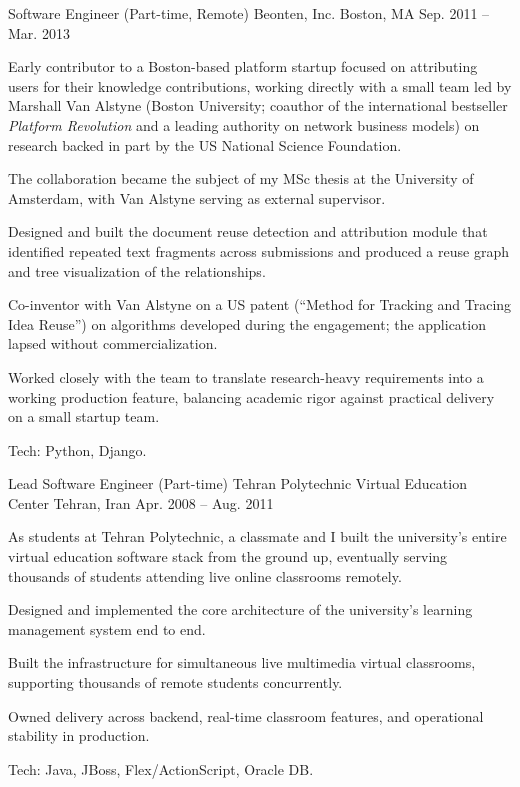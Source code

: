 \begin{cventries}
  \cventry
    {Software Engineer (Part-time, Remote)} %
    {Beonten, Inc.} %
    {Boston, MA} %
    {Sep. 2011 -- Mar. 2013} %
    {
      \begin{cvitems} %
        \item {Early contributor to a Boston-based platform startup focused on attributing users for their knowledge contributions, working directly with a small team led by Marshall Van Alstyne (Boston University; coauthor of the international bestseller \emph{Platform Revolution} and a leading authority on network business models) on research backed in part by the US National Science Foundation.}
        \item {The collaboration became the subject of my MSc thesis at the University of Amsterdam, with Van Alstyne serving as external supervisor.}
        \item {Designed and built the document reuse detection and attribution module that identified repeated text fragments across submissions and produced a reuse graph and tree visualization of the relationships.}
        \item {Co-inventor with Van Alstyne on a US patent (``Method for Tracking and Tracing Idea Reuse'') on algorithms developed during the engagement; the application lapsed without commercialization.}
        \item {Worked closely with the team to translate research-heavy requirements into a working production feature, balancing academic rigor against practical delivery on a small startup team.}
        \item {Tech: Python, Django.}
      \end{cvitems}
    }

  \cventry
    {Lead Software Engineer (Part-time)} %
    {Tehran Polytechnic Virtual Education Center} %
    {Tehran, Iran} %
    {Apr. 2008 -- Aug. 2011} %
    {
      \begin{cvitems} %
        \item {As students at Tehran Polytechnic, a classmate and I built the university's entire virtual education software stack from the ground up, eventually serving thousands of students attending live online classrooms remotely.}
        \item {Designed and implemented the core architecture of the university's learning management system end to end.}
        \item {Built the infrastructure for simultaneous live multimedia virtual classrooms, supporting thousands of remote students concurrently.}
        \item {Owned delivery across backend, real-time classroom features, and operational stability in production.}
        \item {Tech: Java, JBoss, Flex/ActionScript, Oracle DB.}
      \end{cvitems}
    }


\end{cventries}
